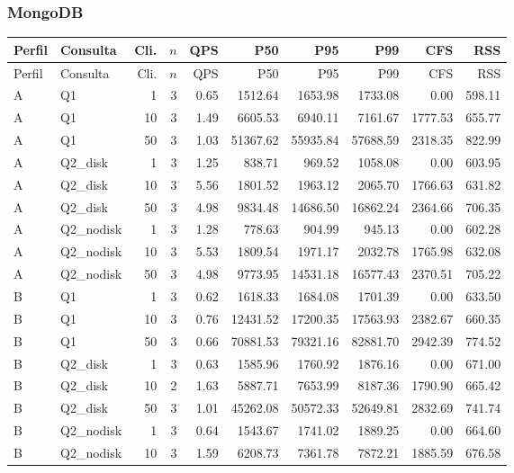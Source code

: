 \documentclass[11pt,letterpaper]{article}
\begin{document}
\subsubsection{MongoDB}
{\fontsize{7.5}{9}\selectfont\setlength{\tabcolsep}{3pt}
\begin{longtable}{llrrrrrrrr}
\toprule Perfil & Consulta & Cli. & $n$ & QPS & P50 & P95 & P99 & CFS & RSS\\\midrule\endfirsthead
\toprule Perfil & Consulta & Cli. & $n$ & QPS & P50 & P95 & P99 & CFS & RSS\\\midrule\endhead
\bottomrule\endfoot
A & Q1 & 1 & 3 & 0.65 & 1512.64 & 1653.98 & 1733.08 & 0.00 & 598.11\\
A & Q1 & 10 & 3 & 1.49 & 6605.53 & 6940.11 & 7161.67 & 1777.53 & 655.77\\
A & Q1 & 50 & 3 & 1.03 & 51367.62 & 55935.84 & 57688.59 & 2318.35 & 822.99\\
A & Q2\_disk & 1 & 3 & 1.25 & 838.71 & 969.52 & 1058.08 & 0.00 & 603.95\\
A & Q2\_disk & 10 & 3 & 5.56 & 1801.52 & 1963.12 & 2065.70 & 1766.63 & 631.82\\
A & Q2\_disk & 50 & 3 & 4.98 & 9834.48 & 14686.50 & 16862.24 & 2364.66 & 706.35\\
A & Q2\_nodisk & 1 & 3 & 1.28 & 778.63 & 904.99 & 945.13 & 0.00 & 602.28\\
A & Q2\_nodisk & 10 & 3 & 5.53 & 1809.54 & 1971.17 & 2032.78 & 1765.98 & 632.08\\
A & Q2\_nodisk & 50 & 3 & 4.98 & 9773.95 & 14531.18 & 16577.43 & 2370.51 & 705.22\\
B & Q1 & 1 & 3 & 0.62 & 1618.33 & 1684.08 & 1701.39 & 0.00 & 633.50\\
B & Q1 & 10 & 3 & 0.76 & 12431.52 & 17200.35 & 17563.93 & 2382.67 & 660.35\\
B & Q1 & 50 & 3 & 0.66 & 70881.53 & 79321.16 & 82881.70 & 2942.39 & 774.52\\
B & Q2\_disk & 1 & 3 & 0.63 & 1585.96 & 1760.92 & 1876.16 & 0.00 & 671.00\\
B & Q2\_disk & 10 & 2 & 1.63 & 5887.71 & 7653.99 & 8187.36 & 1790.90 & 665.42\\
B & Q2\_disk & 50 & 3 & 1.01 & 45262.08 & 50572.33 & 52649.81 & 2832.69 & 741.74\\
B & Q2\_nodisk & 1 & 3 & 0.64 & 1543.67 & 1741.02 & 1889.25 & 0.00 & 664.60\\
B & Q2\_nodisk & 10 & 3 & 1.59 & 6208.73 & 7361.78 & 7872.21 & 1885.59 & 676.58\\

\end{longtable}}
\end{document}
